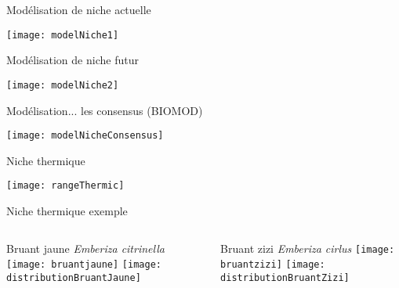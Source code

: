 \documentclass[]{beamer}
\begin{document}
\begin{frame}{Modélisation de niche actuelle}
  \begin{center}
    \texttt{[image: modelNiche1]}
  \end{center}
\end{frame}

\begin{frame}{Modélisation de niche futur}
  \begin{center}
    \texttt{[image: modelNiche2]}
  \end{center}
\end{frame}


\begin{frame}{Modélisation... les consensus (BIOMOD)}
  \begin{center}
    \texttt{[image: modelNicheConsensus]}
  \end{center}
\end{frame}

\begin{frame}{Niche thermique}
  \begin{center}
    \texttt{[image: rangeThermic]}
  \end{center}

\end{frame}

\begin{frame}{Niche thermique exemple}
  \begin{columns}[c]
    \begin{column}[c]{0.5\textwidth}
      \begin{center}
        Bruant jaune \textit{Emberiza citrinella}
        \vspace{10pt}
        \texttt{[image: bruantjaune]}
        \vspace{5pt}
        \texttt{[image: distributionBruantJaune]}   
      \end{center}
    \end{column}
    \begin{column}[c]{0.5\textwidth}
      
      \begin{center}
        Bruant zizi \textit{Emberiza cirlus}
        \vspace{10pt}
        \texttt{[image: bruantzizi]}
        \vspace{5pt}
        \texttt{[image: distributionBruantZizi]}   
      \end{center}
    \end{column}
  \end{columns}
\end{frame}
\end{document}

